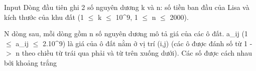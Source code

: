 Input
Dòng đầu tiên ghi 2 số nguyên dương k và n: số tiền ban đầu của Lisa và kích thước của khu đất (1  $\le$  k  $\le$  10^9, 1  $\le$  n  $\le$  2000).  

   N dòng sau, mỗi dòng gồm n số nguyên dương mô tả giá của các ô đất. a\_ij (1  $\le$  a­\_ij  $\le$  2.10^9) là giá của ô đất nằm ở vị trí (i,j) (các ô được đánh số từ 1 -$>$ n theo chiều từ trái qua phải và từ trên xuống dưới). Các số được cách nhau bởi khoảng trắng